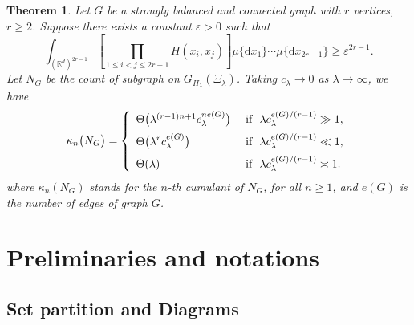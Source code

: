 \documentclass[12pt]{article}
\newcommand{\R}{\mathbb{R}}
\newtheorem{thm}[prop]{Theorem}
\numberwithin{equation}{section}
\begin{document}
\begin{thm}\label{thm-2}
  Let $G$ be a strongly balanced and connected graph with $r$ vertices, $r\ge2$. Suppose there exists a constant $\varepsilon>0$ such that 
  \begin{equation}
    \int_{(\R^d)^{2r-1}}\left[\prod_{1\le i<j\le 2r-1}H(x_i,x_j)\right]\mu\{\mathrm{d}x_1\}\cdots\mu\{\mathrm{d}x_{2r-1}\}\ge \varepsilon^{2r-1}.
  \end{equation}
 Let $N_G$ be the count of subgraph on $G_{H_\lambda}(\Xi_{\lambda})$. Taking $c_\lambda\to0$ as $\lambda\to\infty$, we have
  \begin{eqnarray}
    \kappa_n\big(N_G\big)=\left\{\begin{array}{ll}
      \Theta\big(\lambda^{(r-1)n+1} c_\lambda^{ne(G)}\big) & \ \mbox{if }\ \lambda c_\lambda^{e(G)/(r-1)}\gg1,
      \medskip
      \\
      \displaystyle
\Theta\big(\lambda^{r}c_\lambda^{e(G)}\big) & \ \mbox{if }\ \lambda c_\lambda^{e(G)/(r-1)}\ll1,
    \medskip
    \\
    \displaystyle
    \Theta(\lambda) & \ \mbox{if }\ \lambda c_\lambda^{e(G)/(r-1)}\asymp1.
    \end{array}
    \right.
  \end{eqnarray}
  where $\kappa_n(N_G)$ stands for the $n$-th cumulant of $N_G$, for all $n\ge 1$, and $e(G)$ is the number of edges of graph $G$.
\end{thm}



 

\section{Preliminaries and notations}\label{prelim}
\subsection*{Set partition and Diagrams}
\noindent 
\end{document}
